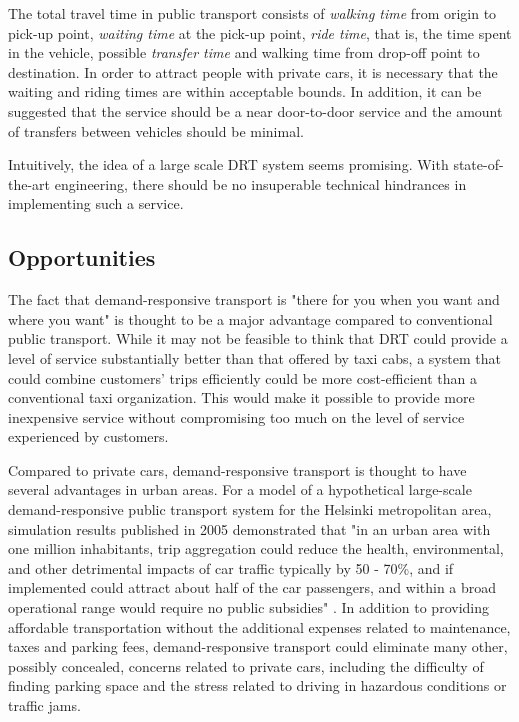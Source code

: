 \documentclass[dissertation,draft*]{aaltoseries}
\begin{document}
The total travel time in public transport consists of
\emph{walking time} from origin to pick-up point, \emph{waiting time} at
the pick-up point, \emph{ride time}, that is, the time spent in the
vehicle, possible \emph{transfer time} and walking time from 
drop-off point to destination. In order %
to attract people with private cars, it is necessary that the waiting and 
riding times are within acceptable bounds. In addition, it can be suggested that
the service should be a near door-to-door service and the amount of
transfers between vehicles should be minimal. 

Intuitively, the idea of a large scale DRT system seems promising.
With state-of-the-art engineering, there should be no insuperable technical hindrances
in implementing such a service.


\subsection{Opportunities}
The fact that demand-responsive transport is "there for you when you want
and where you want" is thought to be a major advantage compared to conventional 
public transport. While it may not be feasible to think that DRT could provide
a level of service substantially better than that offered by taxi cabs, a system that could combine customers'
trips efficiently could be more cost-efficient than a conventional taxi organization.
This would make it possible to provide more inexpensive service without compromising
too much on the level of service experienced by customers.

Compared to private cars, demand-responsive transport is thought to have several advantages in urban areas.
For a model of a hypothetical large-scale demand-responsive public transport system for the Helsinki 
metropolitan area, simulation results published in 2005 demonstrated that "in an urban area with one 
million inhabitants, trip aggregation could reduce the health, environmental, and other detrimental 
impacts of car traffic typically by 50 - 70\%, and if implemented could attract about half of the car 
passengers, and within a broad operational range would require no public subsidies" \cite{tuomisto}. 
In addition to providing affordable transportation without the additional expenses related 
to maintenance, taxes and parking fees, 
demand-responsive transport could eliminate many other, possibly concealed, concerns related to private cars, 
including the difficulty of finding parking space and the stress related to
driving in hazardous conditions or traffic jams.
\end{document}
